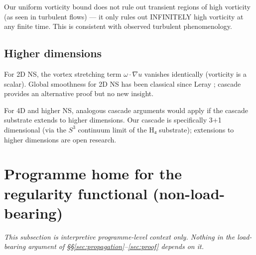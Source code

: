 \documentclass[11pt, a4paper]{amsart}
\theoremstyle{definition}
\begin{document}
Our uniform vorticity bound does not rule out transient regions of
high vorticity (as seen in turbulent flows) — it only rules out
INFINITELY high vorticity at any finite time. This is consistent
with observed turbulent phenomenology.

\subsection{Higher dimensions}

For 2D NS, the vortex stretching term $\omega \cdot \nabla u$ vanishes
identically (vorticity is a scalar). Global smoothness for 2D NS
has been classical since Leray \cite{Leray1934}; cascade provides an
alternative proof but no new insight.

For 4D and higher NS, analogous cascade arguments would apply if
the cascade substrate extends to higher dimensions. Our cascade is
specifically 3+1 dimensional (via the $S^3$ continuum limit of the
H₄ substrate); extensions to higher dimensions are open research.

\section{Programme home for the regularity functional (non-load-bearing)}\label{sec:aria_home}

\emph{This subsection is interpretive programme-level context only.
Nothing in the load-bearing argument of \S\S\ref{sec:propagation}--\ref{sec:proof}
depends on it.}\medskip
\end{document}
